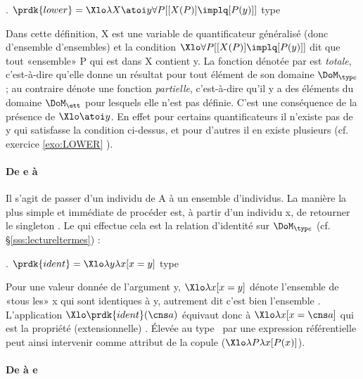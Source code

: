 \fussy

\ex.
\(\prdk{lower} = \Xlo \lambda X\atoi y \forall P[[X(P)] \implq [P(y)]]\)
\hfill type \label{xd:lower}


Dans cette définition, \vrb X est une variable de quantificateur généralisé (donc d'ensemble d'ensembles) et la condition $\Xlo\forall P[[X(P)] \implq [P(y)]]$ dit que tout «ensemble» \vrb P qui est dans \vrb X contient \vrb y. 
La fonction dénotée par  est \emph{totale}, c'est-à-dire qu'elle donne un résultat pour tout élément de son domaine $\DoM_{\typ e}$ ; au contraire  dénote une fonction \emph{partielle}, c'est-à-dire qu'il y a des éléments du domaine $\DoM_{\ett}$ pour lesquels elle n'est pas définie.  
C'est une conséquence de la présence de $\Xlo\atoi y$. 
En effet pour certains quantificateurs il n'existe pas de \vrb y qui satisfasse la condition ci-dessus, et pour d'autres il en existe plusieurs (cf. exercice \ref{exo:LOWER} ).

\paragraph*{De {e} à }

Il s'agit de passer d'un individu de \Unv A à un ensemble d'individus.
La manière la plus simple et immédiate de procéder est, à partir d'un individu \Obj x, de retourner le singleton .  Le  qui effectue cela est la relation d'identité sur $\DoM_{\typ e}$ (cf. \S\ref{sss:lectureltermes}) :

\ex.
\(\prdk{ident} = \Xlo\lambda y \lambda x [x=y]\)
\hfill type \eet


Pour une valeur donnée de l'argument \vrb y, $\Xlo\lambda x[x=y]$ dénote l'ensemble de «tous les» \vrb x qui sont identiques à \vrb y, autrement dit c'est bien l'ensemble .
L'application $\Xlo\prdk{ident}(\cns a)$ équivaut donc à $\Xlo\lambda x[x=\cns a]$ qui est la propriété (extensionnelle) .
Élevée au type \et\ par  une expression référentielle peut ainsi intervenir comme attribut de la copule ($\Xlo\lambda P\lambda x[P(x)]$).


\paragraph*{De  à {e}}

